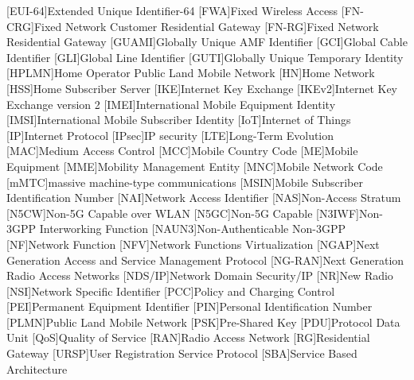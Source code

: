 \begin{multicols}{2}
\begin{acronym}[AAAAAA]
        [EUI-64]{Extended Unique Identifier-64}
        [FWA]{Fixed Wireless Access}
        [FN-CRG]{Fixed Network Customer Residential Gateway}
        [FN-RG]{Fixed Network Residential Gateway}
        [GUAMI]{Globally Unique AMF Identifier}
        [GCI]{Global Cable Identifier}
        [GLI]{Global Line Identifier}
        [GUTI]{Globally Unique Temporary Identity}
        [HPLMN]{Home Operator Public Land Mobile Network}
        [HN]{Home Network}
        [HSS]{Home Subscriber Server}
        [IKE]{Internet Key Exchange}
        [IKEv2]{Internet Key Exchange version 2}
        [IMEI]{International Mobile Equipment Identity}
        [IMSI]{International Mobile Subscriber Identity}
        [IoT]{Internet of Things}
        [IP]{Internet Protocol}
        [IPsec]{IP security}
        [LTE]{Long-Term Evolution}
        [MAC]{Medium Access Control}
        [MCC]{Mobile Country Code}
        [ME]{Mobile Equipment}
        [MME]{Mobility Management Entity}
        [MNC]{Mobile Network Code}
        [mMTC]{massive machine-type communications}
        [MSIN]{Mobile Subscriber Identification Number}
        [NAI]{Network Access Identifier}
        [NAS]{Non-Access Stratum}
        [N5CW]{Non-5G Capable over WLAN}
        [N5GC]{Non-5G Capable}
        [N3IWF]{Non-3GPP Interworking Function}
        [NAUN3]{Non-Authenticable Non-3GPP}
        [NF]{Network Function}
        [NFV]{Network Functions Virtualization}
        [NGAP]{Next Generation Access and Service Management Protocol}
        [NG-RAN]{Next Generation Radio Access Networks}
        [NDS/IP]{Network Domain Security/IP}
        [NR]{New Radio}
        [NSI]{Network Specific Identifier}
        [PCC]{Policy and Charging Control}
        [PEI]{Permanent Equipment Identifier}
        [PIN]{Personal Identification Number}
        [PLMN]{Public Land Mobile Network}
        [PSK]{Pre-Shared Key}
        [PDU]{Protocol Data Unit}
        [QoS]{Quality of Service}
        [RAN]{Radio Access Network}
        [RG]{Residential Gateway}
        [URSP]{User Registration Service Protocol}
        [SBA]{Service Based Architecture}

\end{acronym}
\end{multicols}
